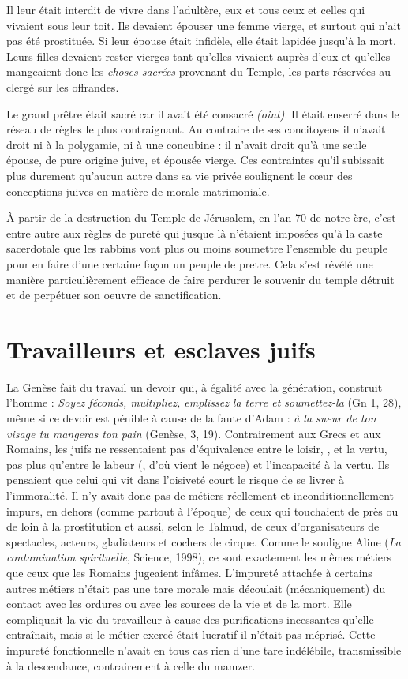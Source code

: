  Il leur était interdit de vivre dans l'adultère, eux et tous ceux et celles qui vivaient sous leur toit. Ils devaient épouser une femme vierge, et surtout qui n'ait pas été prostituée. Si leur épouse était infidèle, elle était lapidée jusqu'à la mort. Leurs filles devaient rester vierges tant qu'elles vivaient auprès d'eux et qu'elles mangeaient donc les \emph{choses sacrées} provenant du Temple, les parts réservées au clergé sur les offrandes. 

 Le grand prêtre était sacré car il avait été consacré \emph{(oint)}. Il était enserré dans le réseau de règles le plus contraignant. Au contraire de ses concitoyens il n'avait droit ni à la polygamie, ni à une concubine : il n'avait droit qu'à une seule épouse, de pure origine juive, et épousée vierge. Ces contraintes qu'il subissait plus durement qu'aucun autre dans sa vie privée soulignent le cœur des conceptions juives en matière de morale matrimoniale.
 
 À partir de la destruction du Temple de Jérusalem, en l'an 70 de notre ère, c'est entre autre aux règles de pureté qui jusque là n'étaient imposées qu'à la caste sacerdotale que les rabbins vont plus ou moins soumettre l'ensemble du peuple pour en faire d'une certaine façon un peuple de pretre. Cela s'est révélé une manière particulièrement efficace de faire perdurer le souvenir du temple détruit et de perpétuer son oeuvre de sanctification.
 
 \section{Travailleurs et esclaves juifs}

 La Genèse fait du travail un devoir qui, à égalité avec la génération, construit l'homme : {\emph{Soyez féconds, multipliez, emplissez la terre et soumettez-la}} (Gn 1, 28), même si ce devoir est pénible à cause de la faute d'Adam : {\emph{à la sueur de ton visage tu mangeras ton pain}} (Genèse, 3, 19). Contrairement aux Grecs et aux Romains, les juifs ne ressentaient pas d'équivalence entre le loisir, {}, et la vertu, pas plus qu'entre le labeur ({}, d'où vient le négoce) et l'incapacité à la vertu. Ils pensaient que celui qui vit dans l'oisiveté court le risque de se livrer à l'immoralité. Il n'y avait donc pas de métiers réellement et inconditionnellement impurs, en dehors (comme partout à l'époque) de ceux qui touchaient de près ou de loin à la prostitution et aussi, selon le Talmud, de ceux d'organisateurs de spectacles, acteurs, gladiateurs et cochers de cirque. Comme le souligne Aline  (\emph{La contamination spirituelle}, Science, 1998), ce sont exactement les mêmes métiers que ceux que les Romains jugeaient infâmes. L'impureté attachée à certains autres métiers n'était pas une tare morale mais découlait (mécaniquement) du contact avec les ordures ou avec les sources de la vie et de la mort. Elle compliquait la vie du travailleur à cause des purifications incessantes qu'elle entraînait, mais si le métier exercé était lucratif il n'était pas méprisé. Cette impureté fonctionnelle n'avait en tous cas rien d'une tare indélébile, transmissible à la descendance, contrairement à celle du mamzer.
 
